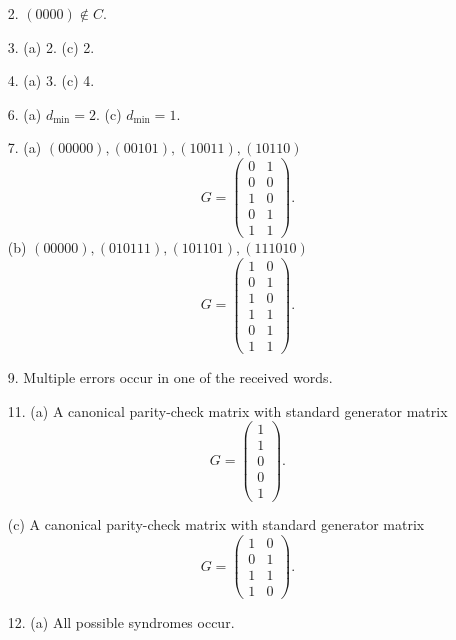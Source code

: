 {\small
\begin{itemize}
 
 
\item[2.] 
$(0000) \notin C$. 
 
\item[3.] 
(a) 2. 
(c) 2.
 
\item[4.]
(a) 3. 
(c) 4.
 
 
\item[6.]
(a) $d_{\min} = 2$. 
(c) $d_{\min} = 1$.
 
 
\item[7.]
(a) $(00000), (00101), (10011), (10110)$
\[
G = 
\begin{pmatrix}
0 & 1 \\
0 & 0 \\
1 & 0 \\
0 & 1 \\
1 & 1
\end{pmatrix}.
\]
(b) $(00000), (010111), (101101), (111010)$
\[
G = 
\begin{pmatrix}
1 & 0 \\
0 & 1 \\
1 & 0 \\
1 & 1 \\ 
0 & 1 \\
1 & 1
\end{pmatrix}.
\]
 
\item[9.]
Multiple errors occur in one of the received words.
 
 
\item[11.]
(a) A canonical parity-check matrix with standard generator
matrix
\[
G = 
\begin{pmatrix}
1 \\ 1 \\ 0 \\ 0 \\ 1
\end{pmatrix}.
\]

(c)
A canonical parity-check matrix with standard generator
matrix
\[
G = 
\begin{pmatrix}
1 & 0 \\
0 & 1 \\
1 & 1 \\
1 & 0
\end{pmatrix}.
\]

 
\item[12.]
(a) All possible syndromes occur.
 

\end{itemize}}
